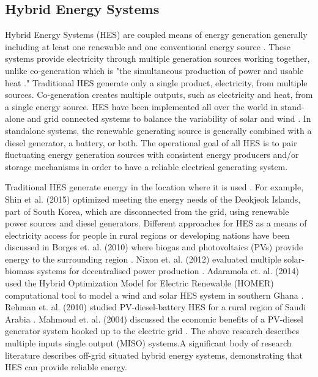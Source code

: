 \documentclass{article}                                                                           %
\begin{document}
\begin{linenumbers}
\subsection{Hybrid Energy Systems}
Hybrid Energy Systems (HES) are coupled means of energy generation generally including at least one renewable and one conventional energy source \cite {Ibrahim2011}. These systems provide electricity through multiple generation sources working together, unlike co-generation which is "the simultaneous production of power and usable heat \cite{Rosen2005}." Traditional HES generate only a single product, electricity, from multiple sources. Co-generation creates multiple outputs, such as electricity and heat, from a single energy source. HES have been implemented all over the world in stand-alone and grid connected systems to balance the variability of solar and wind \cite {Garcia2015, Qi2014, Shin2015, Nixon2012, Adaramola2014, Goodbody2013, BorgesNeto2010, McGowan1996}. In standalone systems, the renewable generating source is generally combined with a diesel generator, a battery, or both. The operational goal of all HES is to pair fluctuating energy generation sources with consistent energy producers and/or storage mechanisms in order to have a reliable electrical generating system. 

Traditional HES generate energy in the location where it is used \cite {Shin2015, Nixon2012, Adaramola2014, Goodbody2013, McGowan1996}. For example, Shin et al. (2015) optimized meeting the energy needs of the Deokjeok Islands, part of South Korea, which are disconnected from the grid, using renewable power sources and diesel generators. Different approaches for HES as a means of electricity access for people in rural regions or developing nations have been discussed in Borges et. al. (2010) where biogas and photovoltaics (PVs) provide energy to the surrounding region \cite{BorgesNeto2010}. Nixon et. al. (2012) evaluated multiple solar-biomass systems for decentralised power production \cite{Nixon2012}. Adaramola et. al. (2014) used the Hybrid Optimization Model for Electric Renewable (HOMER) computational tool to model a wind and solar HES system in southern Ghana \cite{Adaramola2014}. Rehman et. al. (2010) studied PV-diesel-battery HES for a rural region of Saudi Arabia \cite{Rehman2010}. Mahmoud et. al. (2004) discussed the economic benefits of a PV-diesel generator system hooked up to the electric grid \cite {Mahmoud2004}. The above research describes multiple inputs single output (MISO) systems\cite{Garcia2013}.A significant body of research literature describes off-grid situated hybrid energy systems, demonstrating that HES can provide reliable energy. 



\end{linenumbers}
\end{document}
